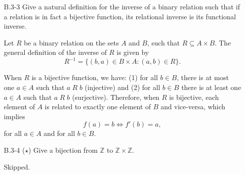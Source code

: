 \begin{enumerate}
\item[B.3{-}3]{Give a natural definition for the inverse of a binary relation
such that if a relation is in fact a bijective function, its relational inverse
is its functional inverse.}

\begin{framed}
Let $R$ be a binary relation on the sets $A$ and $B$, such that
$R \subseteq A \times B$. The general definition of the inverse of $R$ is given
by
\[
  R^{-1} = \{(b, a) \in B \times A : (a, b) \in R\}.
\]

When $R$ is a bijective function, we have: (1) for all $b \in B$, there
is at most one $a \in A$ such that $a\;R\;b$ (injective) and (2) for all
$b \in B$ there is at least one $a \in A$ such that $a\;R\;b$ (surjective).
Therefore, when $R$ is bijective, each element of $A$ is related to exactly
one element of $B$ and vice-versa, which implies
\[
  f(a) = b \iff f'(b) = a,
\]
for all $a \in A$ and for all $b \in B$.
\end{framed}

\item[B.3{-}4]{($\star$) Give a bijection from $\mathbb{Z}$ to
$\mathbb{Z} \times \mathbb{Z}$.}

\begin{framed}
Skipped.
\end{framed}

\end{enumerate}
